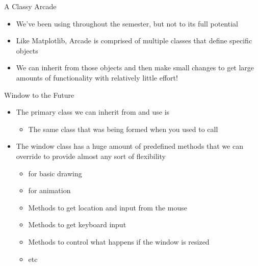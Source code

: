 \documentclass[pdf, aspectratio=169, 12pt]{beamer}
\begin{document}
\begin{frame}{A Classy Arcade}
	\begin{itemize}
		\item We've been using  throughout the semester, but not to its full potential
		\item Like Matplotlib, Arcade is comprised of multiple classes that define specific objects
		\item We can inherit from those objects and then make small changes to get large amounts of functionality with relatively little effort!
	\end{itemize}
\end{frame}

\begin{frame}{Window to the Future}
	\begin{itemize}
		\item The primary class we can inherit from and use is 
			\begin{itemize}
				\item The same class that was being formed when you used to call 
			\end{itemize}
		\item The window class has a huge amount of predefined methods that we can override to provide almost any sort of flexibility
			\begin{itemize}
				\item {} for basic drawing
				\item {} for animation
				\item Methods to get location and input from the mouse
				\item Methods to get keyboard input
				\item Methods to control what happens if the window is resized
				\item etc

			\end{itemize}
			
	\end{itemize}
	
\end{frame}
\end{document}
